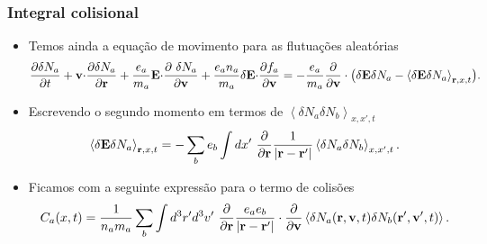 \documentclass[10pt,aspectratio=1610,lualatex]{beamer}
\begin{document}
\begin{frame}[noframenumbering]
  \frametitle{Integral colisional}
  \begin{itemize}
  \item Temos ainda a equação de movimento para as flutuações aleatórias
  \begin{equation}
    \frac{\partial \delta N_a}{\partial t}
    +{\bf v \cdot}\frac{\partial \delta N_a}{\partial \bf r}
    +\frac{e_a}{m_a}{\bf E \cdot} \frac{\partial\ \delta N_a}{\partial \bf v}
    +\frac{e_an_a}{m_a}\delta {\bf E \cdot} \frac{\partial f_a}{\partial \bf v}
    =-\frac{e_a}{m_a}\frac{\partial}{\partial \bf v}
    \cdot \bigl(\delta{\bf E}\delta N_a
    -\left<\delta{\bf E}\delta N_a\right>_{{\bf r},x,t} \bigr).
  \label{evol-flut}
  \end{equation}
\item Escrevendo o segundo momento em termos de
  $\left<\delta N_a \delta N_b\right>_{x,x',t}$ 
  \begin{equation}
  \left<\delta {\bf E} \delta N_a \right>_{{\bf r},x,t}
  =-\sum_b e_b \int dx'\ \frac{\partial}{\partial \bf r} \frac{1}{|{\bf r-r'}|}
  \left<\delta N_a \delta N_b \right>_{x,x',t}.
  \label{pot-ave}
  \end{equation}
\item Ficamos com a seguinte expressão para o termo de colisões
  \begin{equation}
  C_a(x,t)=\frac{1}{n_am_a}\sum_b\int d^3r'd^3v'\
  \frac{\partial}{\partial \bf r}\frac{e_ae_b}{\bf | r-r'|}
  \cdot\frac{\partial}{\partial \bf v}
  \left<\delta N_a({\bf r,v},t)\delta N_b({\bf r',v'},t)\right>.
  \label{c_a}
  \end{equation}
  \end{itemize}
\end{frame}
\end{document}

